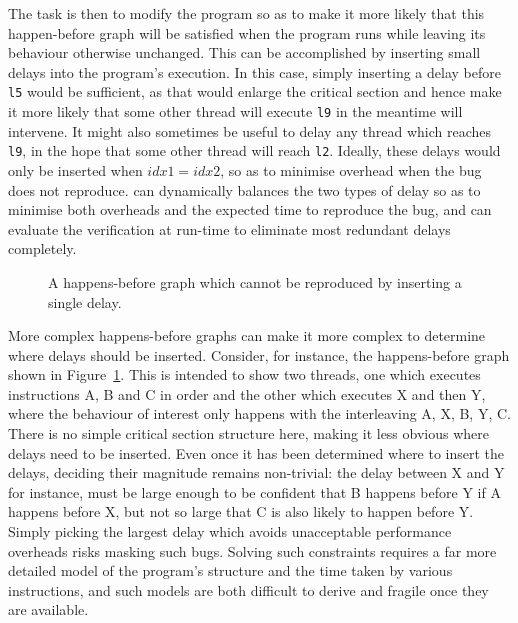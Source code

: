The task is then to modify the program so as to make it more likely
that this happen-before graph will be satisfied when the program runs
while leaving its behaviour otherwise unchanged.  This can be
accomplished by inserting small delays into the program's execution.
In this case, simply inserting a delay before \verb|l5| would be
sufficient, as that would enlarge the critical section and hence make
it more likely that some other thread will execute \verb|l9| in the
meantime will intervene.  It might also sometimes be useful to delay
any thread which reaches \verb|l9|, in the hope that some other thread
will reach \verb|l2|.  Ideally, these delays would only be inserted
when $idx1 = idx2$, so as to minimise overhead when the bug does not
reproduce.  {\Technique} can dynamically balances the two types of
delay so as to minimise both overheads and the expected time to
reproduce the bug, and can evaluate the verification at run-time to
eliminate most redundant delays completely.

\begin{figure}
  \caption{A happens-before graph which cannot be reproduced by
    inserting a single delay.}
  \label{fig:enforce_crash:complex_hb}
\end{figure}

More complex happens-before graphs can make it more complex to
determine where delays should be inserted.  Consider, for instance,
the happens-before graph shown in
Figure~\ref{fig:enforce_crash:complex_hb}.  This is intended to show
two threads, one which executes instructions A, B and C in order and
the other which executes X and then Y, where the behaviour of interest
only happens with the interleaving A, X, B, Y, C.  There is no simple
critical section structure here, making it less obvious where delays
need to be inserted.  Even once it has been determined where to insert
the delays, deciding their magnitude remains non-trivial: the delay
between X and Y for instance, must be large enough to be confident
that B happens before Y if A happens before X, but not so large that C
is also likely to happen before Y.  Simply picking the largest delay
which avoids unacceptable performance overheads risks masking such
bugs.  Solving such constraints requires a far more detailed model of
the program's structure and the time taken by various instructions,
and such models are both difficult to derive and fragile once they are
available.


